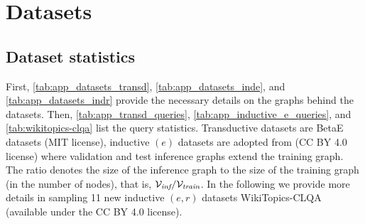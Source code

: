 \section{Datasets}
\label{app:datasets}

\subsection{Dataset statistics}
First, \autoref{tab:app_datasets_transd}, \autoref{tab:app_datasets_inde}, and \autoref{tab:app_datasets_indr} provide the necessary details on the graphs behind the \clqa datasets. 
Then, \autoref{tab:app_transd_queries}, \autoref{tab:app_inductive_e_queries}, and \autoref{tab:wikitopics-clqa} list the query statistics. 
Transductive datasets are BetaE~\citep{betae} datasets (MIT license), inductive $(e)$ datasets are adopted from \citet{galkin2022} (CC BY 4.0 license) where validation and test inference graphs extend the training graph. The ratio denotes the size of the inference graph to the size of the training graph (in the number of nodes), that is, ${\mathcal{V}}_{\textit{inf}} / {\mathcal{V}}_{\textit{train}}$.
In the following  we provide more details in sampling 11 new inductive $(e,r)$ datasets WikiTopics-CLQA (available under the CC BY 4.0 license).


